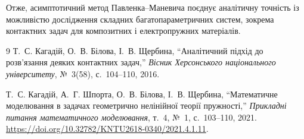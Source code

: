 Отже, асимптотичний метод Павленка--Маневича поєднує аналітичну точність із можливістю дослідження складних багатопараметричних систем, зокрема контактних задач для композитних і електропружних матеріалів.

\begin{thebibliography}{9}
Т.~С. Кагадій, О.~В. Білова, І.~В. Щербина,
``Аналітичний підхід до розв’язання деяких контактних задач,''
\emph{Вісник Херсонського національного університету}, №~3(58), с.~104--110, 2016.

Т.~С. Кагадій, А.~Г. Шпорта, О.~В. Білова, І.~В. Щербина,
``Математичне моделювання в задачах геометрично нелінійної теорії пружності,''
\emph{Прикладні питання математичного моделювання}, т.~4, №~1, с.~103--110, 2021.
\url{https://doi.org/10.32782/KNTU2618-0340/2021.4.1.11}.
\end{thebibliography}

